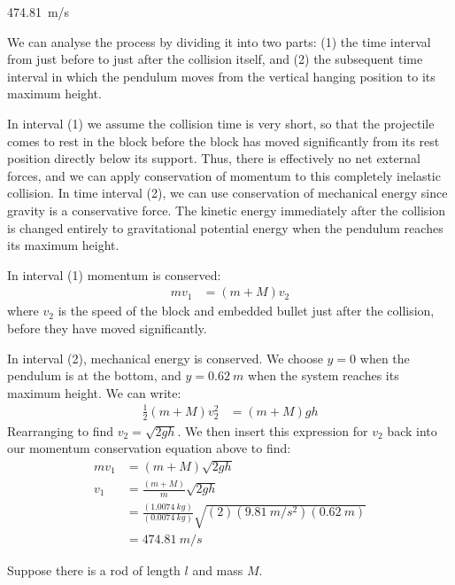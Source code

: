 \begin{finalanswer}
\SI{474.81}{m/s}
\end{finalanswer}
\begin{solution}
We can analyse the process by dividing it into two parts: (1) the time interval from just before to just after the collision itself, and (2) the subsequent time interval in which the pendulum moves from the vertical hanging position to its maximum height. 


In interval (1) we assume the collision time is very short, so that the projectile comes to rest in the block before the block has moved significantly from its rest position directly below its support. Thus, there is effectively no net external forces, and we can apply conservation of momentum to this completely inelastic collision. In time interval (2), we can use conservation of mechanical energy since gravity is a conservative force. The kinetic energy immediately after the collision is changed entirely to gravitational potential energy when the pendulum reaches its maximum height.

In interval (1) momentum is conserved:
\begin{align*}
mv_1 &= (m+M)v_2
\end{align*}
where $v_2$ is the speed of the block and embedded bullet just after the collision, before they have moved significantly. 

In interval (2), mechanical energy is conserved. We choose $y=0$ when the pendulum is at the bottom, and $y=\SI{0.62}{m}$ when the system reaches its maximum height. We can write:
\begin{align*}
\frac{1}{2}(m+M)v_2^2 &= (m+M)gh
\end{align*}
Rearranging to find $v_2 = \sqrt{2gh}$. We then insert this expression for $v_2$ back into our momentum conservation equation above to find:
\begin{align*}
mv_1 &= (m+M)\sqrt{2gh}\\
v_1 &= \frac{(m+M)}{m}\sqrt{2gh}\\
&=\frac{ (\SI{1.0074}{kg})}{(\SI{0.0074}{kg})}\sqrt{(2)(\SI{9.81}{m/s^2})(\SI{0.62}{m})}\\
&= \SI{474.81}{m/s}
\end{align*}

\end{solution}


\question Suppose there is a rod of length $l$ and mass $M$.


